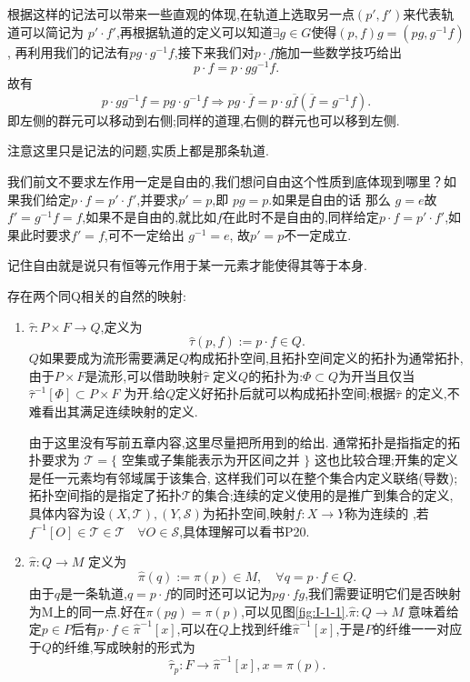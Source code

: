 \documentclass[../main.tex]{subfiles}
\begin{document}
根据这样的记法可以带来一些直观的体现,在轨道上选取另一点$(p',f')$来代表轨道可以简记为 $p'\cdot f'$,再根据轨道的定义可以知道$\exists g \in G$使得$(p,f)g = (pg,g^{-1}f)$,
再利用我们的记法有$pg \cdot g^{-1}f$,接下来我们对$p\cdot f$施加一些数学技巧给出\[
p \cdot  f = p \cdot gg^{-1}f
.\] 
故有 \[
p\cdot gg^{-1}f =  pg \cdot g^{-1}f \Longrightarrow pg \cdot\overline{f} = p \cdot g\overline{f}(\overline{f} = g^{-1}f) 
.\]
即左侧的群元可以移动到右侧;同样的道理,右侧的群元也可以移到左侧.
\begin{note}
 注意这里只是记法的问题,实质上都是那条轨道. 
\end{note}
我们前文不要求左作用一定是自由的,我们想问自由这个性质到底体现到哪里？如果我们给定$p\cdot f = p'\cdot f'$,并要求$p' = p$,即 $pg = p$.如果是自由的话
那么 $ g = e$故$f' = g^{-1}f = f$,如果不是自由的,就比如$f$在此时不是自由的,同样给定$p\cdot f = p' \cdot f'$,如果此时要求$f' = f$,可不一定给出 $g^{-1} = e$,
故$p' = p$不一定成立.
 \begin{note}
 记住自由就是说只有恒等元作用于某一元素才能使得其等于本身. 
\end{note}
存在两个同Q相关的自然的映射:
\begin{enumerate}
\item  $\hat{\tau}:P\times F \to Q$,定义为\[\hat{\tau}(p,f):= p \cdot f \in Q.\]
  $Q$如果要成为流形需要满足$Q$构成拓扑空间,且拓扑空间定义的拓扑为通常拓扑,由于$P\times F$是流形,可以借助映射$\hat{\tau}$ 定义$Q$的拓扑为:$\Phi \subset Q$为开当且仅当
  $\hat{\tau}^{-1}[\Phi] \subset P \times F$ 为开.给$Q$定义好拓扑后就可以构成拓扑空间;根据$\hat{\tau}$ 的定义,不难看出其满足连续映射的定义.
  \begin{note}
     由于这里没有写前五章内容,这里尽量把所用到的给出. 通常拓扑是指指定的拓扑要求为
     $\mathscr{T}=\{$ 空集或子集能表示为开区间之并 $\}$
     这也比较合理;开集的定义是任一元素均有邻域属于该集合,
   这样我们可以在整个集合内定义联络(导数);拓扑空间指的是指定了拓扑$\mathscr{T}$的集合;连续的定义使用的是推广到集合的定义,具体内容为设$(X,\mathscr{T}),(Y,\mathscr{S})$为拓扑空间,映射$f:X \to Y$称为连续的
   ,若$f^{-1}[O] \in \mathscr{T} \in \mathscr{T}\quad \forall O \in \mathscr{S}$,具体理解可以看书P20.
  \end{note}
\item $\hat{\pi}: Q\to M$ 定义为\[
\hat{\pi}(q):= \pi(p) \in M, \quad \forall q =  p\cdot f \in Q 
.\] 由于$q$是一条轨道,$q = p \cdot f$的同时还可以记为$pg \cdot fg$,我们需要证明它们是否映射为M上的同一点.好在$\pi(pg) = \pi(p)$,可以见图\ref{fig:I-1-1}.$\hat{\pi}:Q\to M$ 
意味着给定$p \in P$后有$p\cdot f \in \hat{\pi}^{-1}[x]$,可以在$Q$上找到纤维$\hat{\pi}^{-1}[x]$,于是$P$的纤维一一对应于$Q$的纤维,写成映射的形式为\[
  \hat{\tau}_p:F \to \hat{\pi}^{-1}[x] , x=\pi(p)
.\] 
\end{enumerate}
\end{document}
